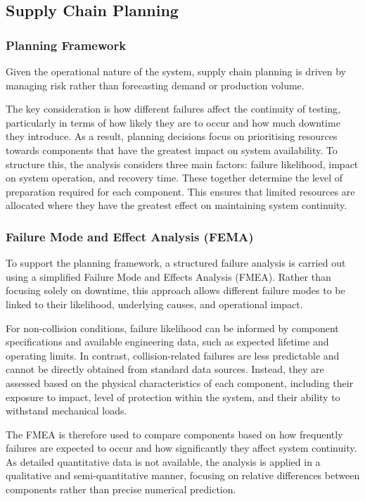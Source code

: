 \documentclass[a4paper,11pt]{article}
\begin{document}
\subsection{Supply Chain Planning}

\subsubsection{Planning Framework}

Given the operational nature of the system, supply chain planning is driven by managing risk rather than forecasting demand or production volume.

The key consideration is how different failures affect the continuity of testing, particularly in terms of how likely they are to occur and how much downtime they introduce. As a result, planning decisions focus on prioritising resources towards components that have the greatest impact on system availability.  To structure this, the analysis considers three main factors: failure likelihood, impact on system operation, and recovery time. These together determine the level of preparation required for each component. This ensures that limited resources are allocated where they have the greatest effect on maintaining system continuity.

\subsubsection{Failure Mode and Effect Analysis (FEMA)}

To support the planning framework, a structured failure analysis is carried out using a simplified Failure Mode and Effects Analysis (FMEA). Rather than focusing solely on downtime, this approach allows different failure modes to be linked to their likelihood, underlying causes, and operational impact.

For non-collision conditions, failure likelihood can be informed by component specifications and available engineering data, such as expected lifetime and operating limits. In contrast, collision-related failures are less predictable and cannot be directly obtained from standard data sources. Instead, they are assessed based on the physical characteristics of each component, including their exposure to impact, level of protection within the system, and their ability to withstand mechanical loads.

The FMEA is therefore used to compare components based on how frequently failures are expected to occur and how significantly they affect system continuity. As detailed quantitative data is not available, the analysis is applied in a qualitative and semi-quantitative manner, focusing on relative differences between components rather than precise numerical prediction.
\end{document}
